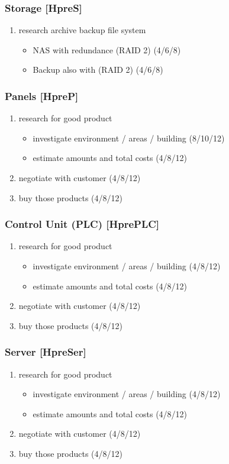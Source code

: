 \subsubsection{Storage [HpreS]}
\label{sec:orgeb93f9e}
\begin{enumerate}
\item research archive backup file system
\begin{itemize}
\item NAS with redundance (RAID 2) (4/6/8)
\item Backup also with (RAID 2) (4/6/8)
\end{itemize}
\end{enumerate}

\subsubsection{Panels [HpreP]}
\label{sec:org4b41c6c}
\begin{enumerate}
\item research for good product
\begin{itemize}
\item investigate environment / areas / building (8/10/12)
\item estimate amounts and total costs (4/8/12)
\end{itemize}
\item negotiate with customer (4/8/12)
\item buy those products (4/8/12)
\end{enumerate}

\subsubsection{Control Unit (PLC) [HprePLC]}
\label{sec:orgd40ef86}
\begin{enumerate}
\item research for good product
\begin{itemize}
\item investigate environment / areas / building (4/8/12)
\item estimate amounts and total costs (4/8/12)
\end{itemize}
\item negotiate with customer (4/8/12)
\item buy those products (4/8/12)
\end{enumerate}

\subsubsection{Server [HpreSer]}
\label{sec:org7b31fb6}
\begin{enumerate}
\item research for good product
\begin{itemize}
\item investigate environment / areas / building (4/8/12)
\item estimate amounts and total costs (4/8/12)
\end{itemize}
\item negotiate with customer (4/8/12)
\item buy those products (4/8/12)
\end{enumerate}
